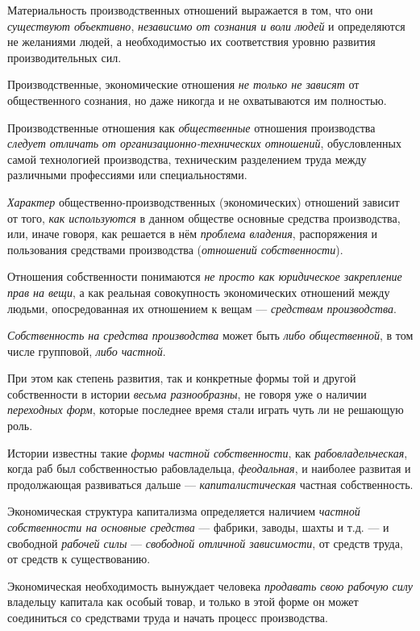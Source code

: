 \documentclass[a4paper,14pt,russian]{extreport}
\begin{document}
Материальность производственных отношений выражается в том, что они \emph{существуют объективно}, \emph{независимо от сознания и воли людей} и определяются не желаниями людей, а необходимостью их соответствия уровню развития производительных сил.

Производственные, экономические отношения \emph{не только не зависят} от общественного сознания, но даже никогда и не охватываются им полностью.

Производственные отношения как \emph{общественные} отношения производства \emph{следует отличать} \emph{от организационно-технических отношений}, обусловленных самой технологией производства, техническим разделением труда между различными профессиями или специальностями.

\emph{Характер} общественно-производственных (экономических) отношений зависит от того, \emph{как используются} в данном обществе основные средства производства, или, иначе говоря, как решается в нём \emph{проблема владения}, распоряжения и пользования средствами производства (\emph{отношений собственности}).

Отношения собственности понимаются \emph{не просто как юридическое закрепление прав на вещи}, а как реальная совокупность экономических отношений между людьми, опосредованная их отношением к вещам --- \emph{средствам производства}.

\emph{Собственность на средства производства} может быть \emph{либо общественной}, в том числе групповой, \emph{либо частной}.

При этом как степень развития, так и конкретные формы той и другой собственности в истории \emph{весьма разнообразны}, не говоря уже о наличии \emph{переходных форм}, которые последнее время стали играть чуть ли не решающую роль.

Истории известны такие \emph{формы частной собственности}, как \emph{рабовладельческая}, когда раб был собственностью рабовладельца, \emph{феодальная}, и наиболее развитая и продолжающая развиваться дальше --- \emph{капиталистическая} частная собственность.

Экономическая структура капитализма определяется наличием \emph{частной собственности на основные средства} --- фабрики, заводы, шахты и т.д. --- и свободной \emph{рабочей силы} --- \emph{свободной отличной зависимости}, от средств труда, от средств к существованию.

Экономическая необходимость вынуждает человека \emph{продавать свою рабочую силу} владельцу капитала как особый товар, и только в этой форме он может соединиться со средствами труда и начать процесс производства.
\end{document}
